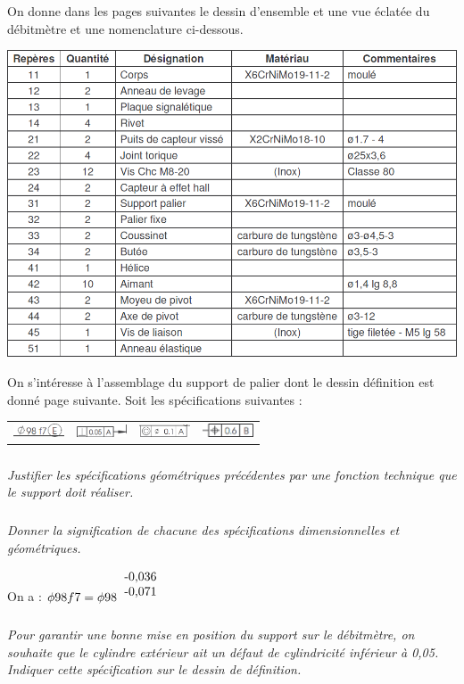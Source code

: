 \documentclass[10pt,fleqn]{article} %
\begin{document}
\begin{multicols}{2}
On donne dans les pages suivantes le dessin d'ensemble et une vue éclatée du débitmètre et une nomenclature ci-dessous.
\begin{center}
\includegraphics[width=\linewidth]{images/debitmetre_04}
\end{center}


On s'intéresse à l'assemblage du support de palier dont le dessin définition est donné page suivante. 
Soit les spécifications suivantes : 
\begin{center}
\begin{tabular}{cccc}
\includegraphics[width=1.5cm]{images/debitmetre_05_a} &
\includegraphics[width=1.5cm]{images/debitmetre_05_b} &
\includegraphics[width=1.5cm]{images/debitmetre_05_c} &
\includegraphics[width=1.5cm]{images/debitmetre_05_d} \\
\end{tabular}
\end{center}

\subparagraph{}\textit{Justifier les spécifications géométriques précédentes par une fonction technique que le support doit réaliser. }

\subparagraph{}\textit{Donner la signification de chacune des spécifications dimensionnelles et géométriques.}

\begin{rem}
On a : $\phi 98 f7 = \phi 98 ^{\begin{tabular}{c}-0,036 \\ -0,071\end{tabular}}$
\end{rem}
\subparagraph{}\textit{Pour garantir une bonne mise en position du support sur le débitmètre, on souhaite que le cylindre extérieur ait un défaut de cylindricité inférieur à 0,05. Indiquer cette spécification sur le dessin de définition. }
\end{multicols}
\end{document}
